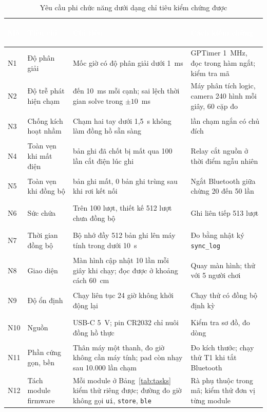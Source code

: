 \begin{table}[H]
    \centering
    \small
    \renewcommand{\arraystretch}{1.35}
    \caption{Yêu cầu phi chức năng dưới dạng chỉ tiêu kiểm chứng được}
    \label{tab:nfr-spec}
    \begin{tabular}{>{\bfseries\raggedright\arraybackslash}m{0.9cm} >{\raggedright\arraybackslash}m{2.6cm} >{\raggedright\arraybackslash}m{4.9cm} >{\raggedright\arraybackslash}m{5.6cm}}
        \toprule
        \rowcolor{haitayblue}
        \textcolor{white}{Mã} & \textcolor{white}{Tiêu chí} & \textcolor{white}{Chỉ tiêu} & \textcolor{white}{Cách kiểm chứng} \\
        \midrule
        \rowcolor{haitayblue!8}
        N1 & Độ phân giải & Mốc giờ có độ phân giải dưới 1~ms & GPTimer 1~MHz, đọc trong hàm ngắt; kiểm tra mã \\
        N2 & Độ trễ phát hiện chạm & 2 đến 10~ms mỗi cạnh; sai lệch thời gian solve trong $\pm 10$~ms & Máy phân tích logic, camera 240 hình mỗi giây, 60 cặp đo \\
        \rowcolor{haitayblue!8}
        N3 & Chống kích hoạt nhầm & Chạm hai tay dưới 1,5~s không làm đồng hồ sẵn sàng & 20 lần chạm ngắn có chủ đích \\
        N4 & Toàn vẹn khi mất điện & 0 bản ghi đã chốt bị mất qua 100 lần cắt điện lúc ghi & Relay cắt nguồn ở thời điểm ngẫu nhiên \\
        \rowcolor{haitayblue!8}
        N5 & Toàn vẹn khi đồng bộ & 0 bản ghi mất, 0 bản ghi trùng sau khi rơi kết nối & Ngắt Bluetooth giữa chừng 20 đến 50 lần \\
        N6 & Sức chứa & Trên 100 lượt, thiết kế 512 lượt chưa đồng bộ & Ghi liên tiếp 513 lượt \\
        \rowcolor{haitayblue!8}
        N7 & Thời gian đồng bộ & Bộ nhớ đầy 512 bản ghi lên máy tính trong dưới 10~s & Đo bằng nhật ký \texttt{sync\_log} \\
        N8 & Giao diện & Màn hình cập nhật 10 lần mỗi giây khi chạy; đọc được ở khoảng cách 60~cm & Quay màn hình; thử với 5 người chơi \\
        \rowcolor{haitayblue!8}
        N9 & Độ ổn định & Chạy liên tục 24 giờ không khởi động lại & Chạy thử có đồng bộ định kỳ \\
        N10 & Nguồn & USB-C 5~V; pin CR2032 chỉ nuôi đồng hồ thực & Kiểm tra sơ đồ, đo dòng \\
        \rowcolor{haitayblue!8}
        N11 & Phần cứng gọn, bền & Thân máy một thanh, đo giờ không cần máy tính; pad còn nhạy sau 10.000 lần chạm & Đo kích thước; chạy thử T1 khi tắt Bluetooth \\
        N12 & Tách module firmware & Mỗi module ở Bảng~\ref{tab:tasks} kiểm thử riêng được; đường đo giờ không gọi \texttt{ui}, \texttt{store}, \texttt{ble} & Rà phụ thuộc trong mã; kiểm thử đơn vị từng module \\
        \bottomrule
    \end{tabular}
\end{table}

